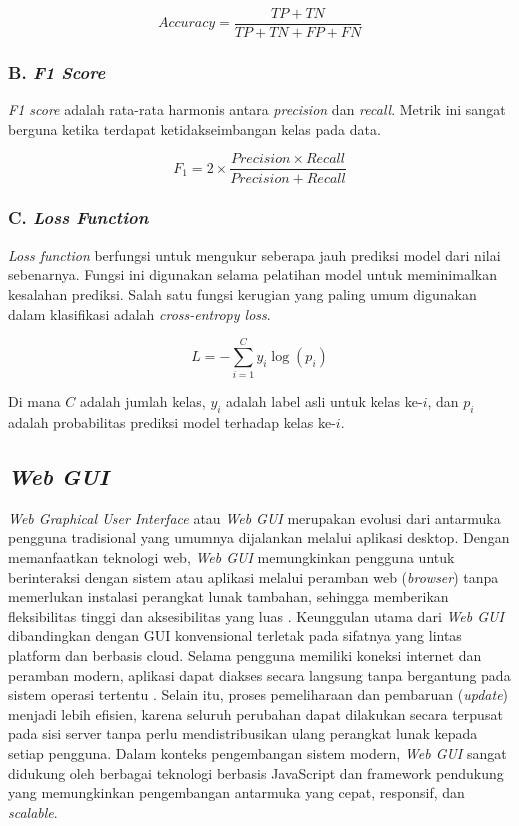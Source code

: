 \begin{equation}
  Accuracy = \frac{TP + TN}{TP + TN + FP + FN}
\end{equation}

\subsubsection{B. \emph{F1 Score}}

\emph{F1 score} adalah rata-rata harmonis antara \emph{precision} dan \emph{recall}. Metrik ini sangat berguna ketika terdapat ketidakseimbangan kelas pada data.

\begin{equation}
  F_1 = 2 \times \frac{Precision \times Recall}{Precision + Recall}
\end{equation}

\subsubsection{C. \emph{Loss Function}}

\emph{Loss function} berfungsi untuk mengukur seberapa jauh prediksi model dari nilai sebenarnya. Fungsi ini digunakan selama pelatihan model untuk meminimalkan kesalahan prediksi. Salah satu fungsi kerugian yang paling umum digunakan dalam klasifikasi adalah \emph{cross-entropy loss}.

\begin{equation}
L = -\sum_{i=1}^{C} y_i \log(p_i)
\end{equation}

Di mana \( C \) adalah jumlah kelas, \( y_i \) adalah label asli untuk kelas ke-\(i\), dan \( p_i \) adalah probabilitas prediksi model terhadap kelas ke-\(i\).


\subsection{\emph{Web GUI}}

\emph{Web Graphical User Interface} atau \emph{Web GUI} merupakan evolusi dari antarmuka pengguna tradisional yang umumnya dijalankan melalui aplikasi desktop. Dengan memanfaatkan teknologi web, \emph{Web GUI} memungkinkan pengguna untuk berinteraksi dengan sistem atau aplikasi melalui peramban web (\emph{browser}) tanpa memerlukan instalasi perangkat lunak tambahan, sehingga memberikan fleksibilitas tinggi dan aksesibilitas yang luas \cite{krug2014dont}. Keunggulan utama dari \emph{Web GUI} dibandingkan dengan GUI konvensional terletak pada sifatnya yang lintas platform dan berbasis cloud. Selama pengguna memiliki koneksi internet dan peramban modern, aplikasi dapat diakses secara langsung tanpa bergantung pada sistem operasi tertentu \cite{murugesan2007web}. Selain itu, proses pemeliharaan dan pembaruan (\emph{update}) menjadi lebih efisien, karena seluruh perubahan dapat dilakukan secara terpusat pada sisi server tanpa perlu mendistribusikan ulang perangkat lunak kepada setiap pengguna. Dalam konteks pengembangan sistem modern, \emph{Web GUI} sangat didukung oleh berbagai teknologi berbasis JavaScript dan framework pendukung yang memungkinkan pengembangan antarmuka yang cepat, responsif, dan \emph{scalable}. 

